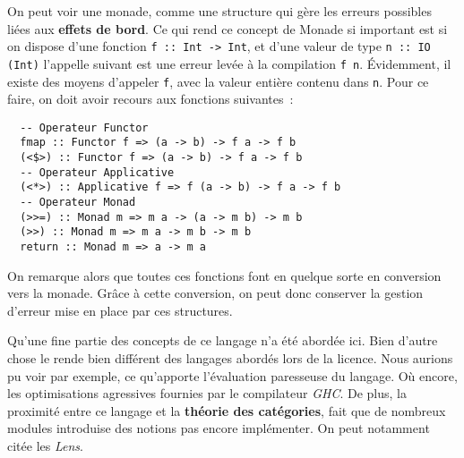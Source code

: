 On peut voir une monade, comme une structure qui gère les erreurs possibles 
liées aux \textbf{effets de bord}. Ce qui rend ce concept de Monade si 
important est si on dispose d'une fonction 
\texttt{f :: Int -> Int}, et d'une valeur de type 
\texttt{n :: IO (Int)} l'appelle suivant est une erreur levée à la 
compilation \texttt{f n}. Évidemment, il existe des moyens 
d'appeler \texttt{f}, avec la valeur entière contenu dans 
\texttt{n}. Pour ce faire, on doit avoir recours aux fonctions 
suivantes~: 

\begin{verbatim}
  -- Operateur Functor
  fmap :: Functor f => (a -> b) -> f a -> f b
  (<$>) :: Functor f => (a -> b) -> f a -> f b
  -- Operateur Applicative
  (<*>) :: Applicative f => f (a -> b) -> f a -> f b
  -- Operateur Monad
  (>>=) :: Monad m => m a -> (a -> m b) -> m b
  (>>) :: Monad m => m a -> m b -> m b
  return :: Monad m => a -> m a
\end{verbatim}

On remarque alors que toutes ces fonctions font en quelque sorte en conversion 
vers la monade. Grâce à cette conversion, on peut donc conserver la gestion 
d'erreur mise en place par ces structures.

Qu'une fine partie des concepts de ce langage n'a été abordée ici. Bien d'autre
chose le rende bien différent des langages abordés lors de la licence. Nous 
aurions pu voir par exemple, ce qu'apporte l'évaluation paresseuse du langage. 
Où encore, les optimisations agressives fournies par le compilateur 
\textit{GHC}. De plus, la proximité entre ce langage et la 
\textbf{théorie des catégories}, fait que de nombreux modules introduise des 
notions pas encore implémenter. On peut notamment citée les \textit{Lens}.